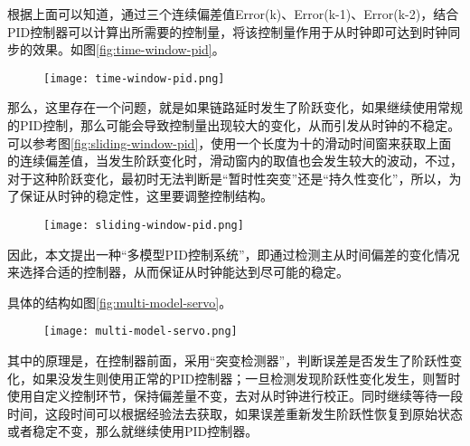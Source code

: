 根据上面可以知道，通过三个连续偏差值Error(k)、Error(k-1)、Error(k-2)，结合PID控制器可以计算出所需要的控制量，将该控制量作用于从时钟即可达到时钟同步的效果。如图\ref{fig:time-window-pid}。
\begin{figure}[htbp]
  \centering
  \begin{minipage}[b]{0.7\textwidth}
   \captionstyle{\centering}
   \centering
   \texttt{[image: time-window-pid.png]}
  \end{minipage}     
\end{figure}


那么，这里存在一个问题，就是如果链路延时发生了阶跃变化，如果继续使用常规的PID控制，那么可能会导致控制量出现较大的变化，从而引发从时钟的不稳定。可以参考图\ref{fig:sliding-window-pid}，使用一个长度为十的滑动时间窗来获取上面的连续偏差值，当发生阶跃变化时，滑动窗内的取值也会发生较大的波动，不过，对于这种阶跃变化，最初时无法判断是“暂时性突变”还是“持久性变化”，所以，为了保证从时钟的稳定性，这里要调整控制结构。
\begin{figure}[htbp]
  \centering
  \begin{minipage}[b]{0.7\textwidth}
   \captionstyle{\centering}
   \centering
   \texttt{[image: sliding-window-pid.png]}
  \end{minipage}     
\end{figure}

因此，本文提出一种“多模型PID控制系统”，即通过检测主从时间偏差的变化情况来选择合适的控制器，从而保证从时钟能达到尽可能的稳定。

具体的结构如图\ref{fig:multi-model-servo}。
\begin{figure}[htbp]
  \centering
  \begin{minipage}[b]{0.7\textwidth}
   \captionstyle{\centering}
   \centering
   \texttt{[image: multi-model-servo.png]}
  \end{minipage}     
\end{figure}

其中的原理是，在控制器前面，采用“突变检测器”，判断误差是否发生了阶跃性变化，如果没发生则使用正常的PID控制器；一旦检测发现阶跃性变化发生，则暂时使用自定义控制环节，保持偏差量不变，去对从时钟进行校正。同时继续等待一段时间，这段时间可以根据经验法去获取，如果误差重新发生阶跃性恢复到原始状态或者稳定不变，那么就继续使用PID控制器。

